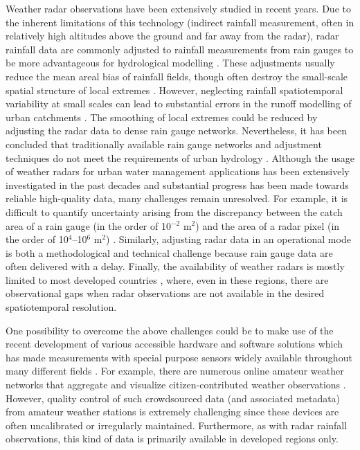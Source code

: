 \documentclass{ctuthesis}\usepackage[]{graphicx}\usepackage[]{color}
\begin{document}
Weather radar observations have been extensively studied in recent years. Due to the inherent limitations of this technology (indirect rainfall measurement, often in relatively high altitudes above the ground and far away from the radar), radar rainfall data are commonly adjusted to rainfall measurements from rain gauges to be more advantageous for hydrological modelling \citep{harrisonHighresolutionPrecipitationEstimates2009}. These adjustments usually reduce the mean areal bias of rainfall fields, though often destroy the small-scale spatial structure of local extremes \citep{wangSingularitysensitiveGaugebasedRadar2015}. However, neglecting rainfall spatiotemporal variability at small scales can lead to substantial errors in the runoff modelling of urban catchments 
\citep{giresQuantifyingImpactSmall2012}. The smoothing of local extremes could be reduced by adjusting the radar data to dense rain gauge networks. Nevertheless, it has been concluded that traditionally available rain gauge networks and adjustment techniques do not meet the requirements of urban hydrology \citep{wangRadarRaingaugeData2013, borupDynamicGaugeAdjustment2016}. Although the usage of weather radars for urban water management applications has been extensively investigated in the past decades and substantial progress has been made towards reliable high-quality data, many challenges remain unresolved. For example, it is difficult to quantify uncertainty arising from the discrepancy between the catch area of a rain gauge (in the order of 10$^{-2}$ m$^2$) and the area of a radar pixel (in the order of 10$^4$--10$^6$ m$^2$) \citep[e.g.][]{anagnostouUncertaintyQuantificationMeanAreal1999}. Similarly, adjusting radar data in an operational mode is both a methodological and technical challenge because rain gauge data are often delivered with a delay. Finally, the availability of weather radars is mostly limited to most developed countries \citep{heistermannTechnicalNoteOpen2013}, where, even in these regions, there are observational gaps when radar observations are not available in the desired spatiotemporal resolution.

One possibility to overcome the above challenges could be to make use of the recent development of various accessible hardware and software solutions which has made measurements with special purpose sensors widely available throughout many different fields \citep{swanSensorManiaInternet2012}. For example, there are numerous online amateur weather networks that aggregate and visualize citizen-contributed weather observations \citep{gharesifardBenchmarkingCitizenObservatories2017, devosPotentialUrbanRainfall2017}. However, quality control of such crowdsourced data (and associated metadata) from amateur weather stations is extremely challenging since these devices are often uncalibrated or irregularly maintained. Furthermore, as with radar rainfall observations, this kind of data is primarily available in developed regions only.
\end{document}
